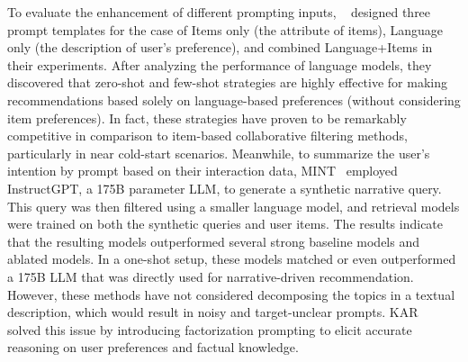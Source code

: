 \documentclass[sn-mathphys-num]{sn-jnl}%
\theoremstyle{thmstyleone}%
\theoremstyle{thmstyletwo}%
\theoremstyle{thmstylethree}%
\begin{document}
To evaluate the enhancement of different prompting inputs, ~\cite{sanner2023large} designed three prompt templates for the case of Items only (the attribute of items), Language only (the description of user's preference), and combined Language+Items in their experiments. After analyzing the performance of language models, they discovered that zero-shot and few-shot strategies are highly effective for making recommendations based solely on language-based preferences (without considering item preferences). 
In fact, these strategies have proven to be remarkably competitive in comparison to item-based collaborative filtering methods, particularly in near cold-start scenarios. Meanwhile, to summarize the user's intention by prompt based on their interaction data, MINT~\cite{mysore2023large} employed InstructGPT, a 175B parameter LLM, to generate a synthetic narrative query. This query was then filtered using a smaller language model, and retrieval models were trained on both the synthetic queries and user items. The results indicate that the resulting models outperformed several strong baseline models and ablated models. In a one-shot setup, these models matched or even outperformed a 175B LLM that was directly used for narrative-driven recommendation. However, these methods have not considered decomposing the topics in a textual description, which would result in noisy and target-unclear prompts. KAR~\cite{Xi2023TowardsOR} solved this issue by introducing factorization prompting to elicit accurate reasoning on user preferences and factual knowledge. 
\end{document}

